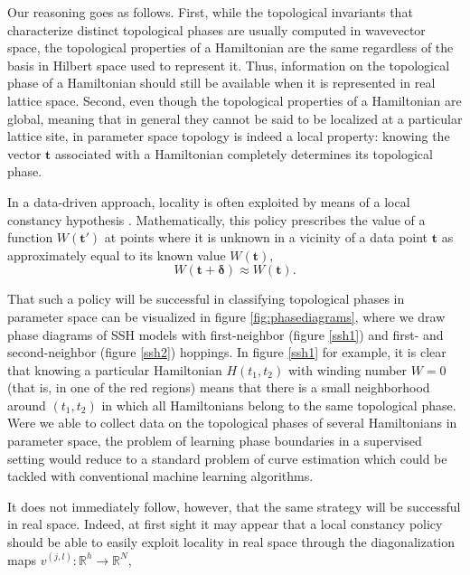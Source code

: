 \documentclass[fleqn,10pt]{wlscirep}
\begin{document}
Our reasoning goes as follows. First, while the topological invariants that characterize distinct topological phases are usually computed in wavevector space, the topological properties of a Hamiltonian are the same regardless of the basis in Hilbert space used to represent it. Thus, information on the topological phase of a Hamiltonian should still be available when it is represented in real lattice space. Second, even though the topological properties of a Hamiltonian are global, meaning that in general they cannot be said to be localized at a particular lattice site, in parameter space topology is indeed a local property: knowing the vector $\mathbf{t}$ associated with a Hamiltonian completely determines its topological phase.

In a data-driven approach, locality is often exploited by means of a local constancy hypothesis . Mathematically, this policy prescribes the value of a function $W(\mathbf{t}')$ at points where it is unknown in a vicinity of a data point $\mathbf{t}$ as approximately equal to its known value $W(\mathbf{t})$,
\begin{equation}
\label{localconstancy}
W(\mathbf{t} + \boldsymbol{\delta}) \approx W(\mathbf{t}).
\end{equation}

That such a policy will be successful in classifying topological phases in parameter space can be visualized in figure \ref{fig:phasediagrams}, where we draw phase diagrams of SSH models with first-neighbor (figure \ref{ssh1}) and first- and second-neighbor (figure \ref{ssh2}) hoppings. In figure \ref{ssh1} for example, it is clear that knowing a particular Hamiltonian $H(t_1,t_2)$ with winding number $W = 0$ (that is, in one of the red regions) means that there is a small neighborhood around $(t_1,t_2)$ in which all Hamiltonians  belong to the same topological phase. Were we able to collect data on the topological phases of several Hamiltonians in parameter space, the problem of learning phase boundaries in a supervised setting would reduce to a standard problem of curve estimation which could be tackled with conventional machine learning algorithms.

It does not immediately follow, however, that the same strategy will be successful in real space. Indeed, at first sight it may appear that a local constancy policy should be able to easily exploit locality in real space through the diagonalization maps $v^{(j,l)}: \mathbb{R}^h \rightarrow \mathbb{R}^{N}$,
\end{document}
